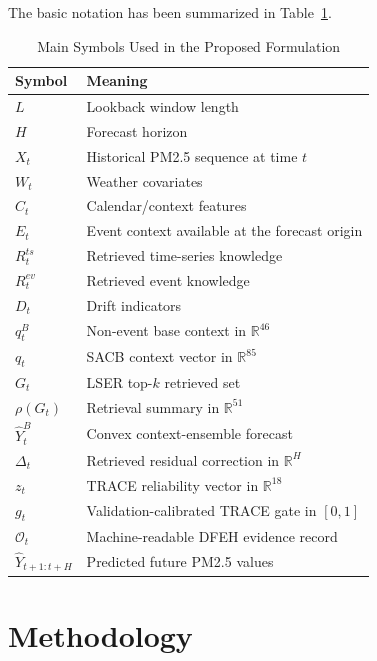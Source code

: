 \documentclass{ieeeaccess}
\begin{document}
The basic notation has been summarized in Table~\ref{tab:symbols}.

\begin{table}[!t]
\centering
\caption{Main Symbols Used in the Proposed Formulation}
\label{tab:symbols}
\begin{tabular}{ll}
\toprule
Symbol & Meaning \\
\midrule
$L$ & Lookback window length \\
$H$ & Forecast horizon \\
$X_t$ & Historical PM2.5 sequence at time $t$ \\
$W_t$ & Weather covariates \\
$C_t$ & Calendar/context features \\
$E_t$ & Event context available at the forecast origin \\
$R^{ts}_t$ & Retrieved time-series knowledge \\
$R^{ev}_t$ & Retrieved event knowledge \\
$D_t$ & Drift indicators \\
$q^B_t$ & Non-event base context in $\mathbb{R}^{46}$ \\
$q_t$ & SACB context vector in $\mathbb{R}^{85}$ \\
$G_t$ & LSER top-$k$ retrieved set \\
$\rho(G_t)$ & Retrieval summary in $\mathbb{R}^{51}$ \\
$\hat{Y}^{B}_t$ & Convex context-ensemble forecast \\
$\Delta_t$ & Retrieved residual correction in $\mathbb{R}^{H}$ \\
$z_t$ & TRACE reliability vector in $\mathbb{R}^{18}$ \\
$g_t$ & Validation-calibrated TRACE gate in $[0,1]$ \\
$\mathcal{O}_t$ & Machine-readable DFEH evidence record \\
$\hat{Y}_{t+1:t+H}$ & Predicted future PM2.5 values \\
\bottomrule
\end{tabular}
\end{table}

\section{Methodology}
\end{document}
